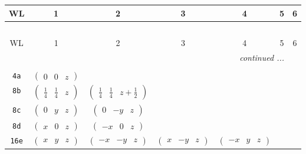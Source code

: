 \documentclass[fleqn,9pt,landscape]{jsarticle}
\begin{document}
\begin{center}
\renewcommand{\arraystretch}{1.2}
\begin{longtable}{ccccccc}
 \hline \hline
WL & 1 & 2 & 3 & 4 & 5 & 6 \\ \hline \endfirsthead

\multicolumn{6}{l}{\tablename\ \thetable{}} \\
 \hline \hline
WL & 1 & 2 & 3 & 4 & 5 & 6 \\ \hline \endhead

 \hline \hline
\multicolumn{6}{r}{\footnotesize\it continued ...} \\ \endfoot

 \hline \hline
\multicolumn{6}{r}{} \\ \endlastfoot

{\tt 4a} & $ \begin{pmatrix} 0 & 0 & z \end{pmatrix} $ & $  $ & $  $ & $  $ \\ \hline
{\tt 8b} & $ \begin{pmatrix} \frac{1}{4} & \frac{1}{4} & z \end{pmatrix} $ & $ \begin{pmatrix} \frac{1}{4} & \frac{1}{4} & z + \frac{1}{2} \end{pmatrix} $ & $  $ & $  $ \\ \hline
{\tt 8c} & $ \begin{pmatrix} 0 & y & z \end{pmatrix} $ & $ \begin{pmatrix} 0 & - y & z \end{pmatrix} $ & $  $ & $  $ \\ \hline
{\tt 8d} & $ \begin{pmatrix} x & 0 & z \end{pmatrix} $ & $ \begin{pmatrix} - x & 0 & z \end{pmatrix} $ & $  $ & $  $ \\ \hline
{\tt 16e} & $ \begin{pmatrix} x & y & z \end{pmatrix} $ & $ \begin{pmatrix} - x & - y & z \end{pmatrix} $ & $ \begin{pmatrix} x & - y & z \end{pmatrix} $ & $ \begin{pmatrix} - x & y & z \end{pmatrix} $ \\
\end{longtable}
\end{center}
\end{document}
